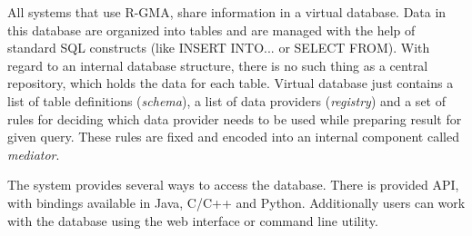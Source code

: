All systems that use R-GMA, share information in a virtual database. Data in this database are organized into tables and are managed with the help of standard SQL constructs (like INSERT INTO... or SELECT FROM). With regard to an internal database structure, there is no such thing as a central repository, which holds the data for each table. Virtual database just contains a list of table definitions (\emph{schema}), a list of data providers (\emph{registry}) and a set of rules for deciding which data provider needs to be used while preparing result for given query. These rules are fixed and encoded into an internal component called \emph{mediator}.

The system provides several ways to access the database. There is provided API, with bindings available in Java, C/C++ and Python. Additionally users can work with the database using the web interface or command line utility.